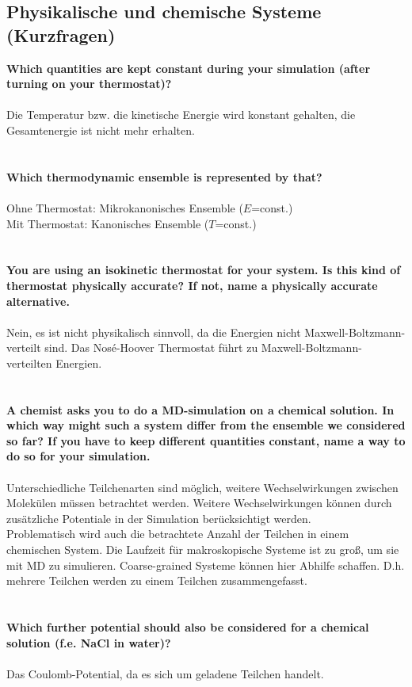 \subsection{Physikalische und chemische Systeme (Kurzfragen)}
\textbf{Which quantities are kept constant during your simulation (after turning on your thermostat)?}
\\
\\
Die Temperatur bzw. die kinetische Energie wird konstant gehalten, die Gesamtenergie ist nicht mehr erhalten.
\\
\\
\\
\textbf{Which thermodynamic ensemble is represented by that?}
\\
\\
Ohne Thermostat: Mikrokanonisches Ensemble ($E$=const.)\\
Mit Thermostat: Kanonisches Ensemble ($T$=const.)
\\
\\
\\
\textbf{You are using an isokinetic thermostat for your system. Is this kind of thermostat physically accurate? If not, name a physically accurate alternative.}
\\
\\
Nein, es ist nicht physikalisch sinnvoll, da die Energien nicht Maxwell-Boltzmann-verteilt sind.
Das Nosé-Hoover Thermostat führt zu Maxwell-Boltzmann-verteilten Energien.
\\
\\
\\
\textbf{A chemist asks you to do a MD-simulation on a chemical solution.
In which way might such a system differ from the ensemble we considered so far?
If you have to keep different quantities constant, name a way to do so for your simulation.}
\\
\\
Unterschiedliche Teilchenarten sind möglich, weitere Wechselwirkungen zwischen Molekülen müssen betrachtet werden.
Weitere Wechselwirkungen können durch zusätzliche Potentiale in der Simulation berücksichtigt werden.
\\
Problematisch wird auch die betrachtete Anzahl der Teilchen in einem chemischen System.
Die Laufzeit für makroskopische Systeme ist zu groß, um sie mit MD zu simulieren.
Coarse-grained Systeme können hier Abhilfe schaffen.
D.h. mehrere Teilchen werden zu einem Teilchen zusammengefasst.
\\
\\
\\
\textbf{Which further potential should also be considered for a chemical solution (f.e. NaCl in water)?}
\\
\\
Das Coulomb-Potential, da es sich um geladene Teilchen handelt.